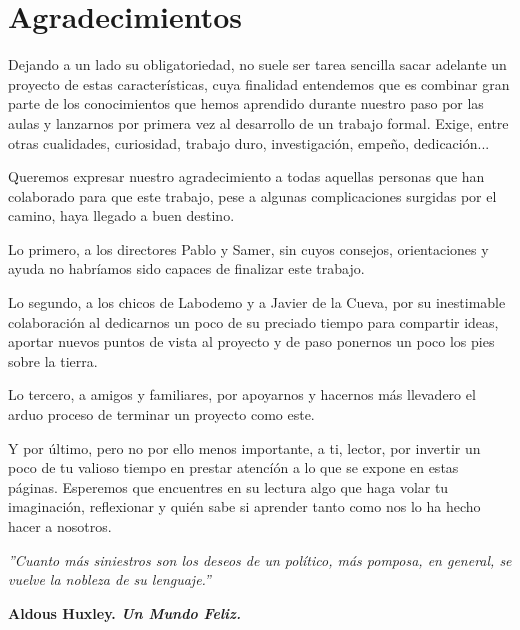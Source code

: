 
\newpage
\thispagestyle{empty}

\chapter*{Agradecimientos}

Dejando a un lado su obligatoriedad, no suele ser tarea sencilla sacar adelante un proyecto de estas características, cuya finalidad entendemos que es combinar gran parte de los conocimientos que hemos aprendido durante nuestro paso por las aulas y lanzarnos por primera vez al desarrollo de un trabajo formal. Exige, entre otras cualidades, curiosidad, trabajo duro, investigación, empeño, dedicación...

Queremos expresar nuestro agradecimiento a todas aquellas personas que han colaborado para que este trabajo, pese a algunas complicaciones surgidas por el camino, haya llegado a buen destino.

Lo primero, a los directores Pablo y Samer, sin cuyos consejos, orientaciones y ayuda no habríamos sido capaces de finalizar este trabajo.

Lo segundo, a los chicos de Labodemo y a Javier de la Cueva, por su inestimable colaboración al dedicarnos un poco de su preciado tiempo para compartir ideas, aportar nuevos puntos de vista al proyecto y de paso ponernos un poco los pies sobre la tierra.

Lo tercero, a amigos y familiares, por apoyarnos y hacernos más llevadero el arduo proceso de terminar un proyecto como este.

Y por último, pero no por ello menos importante, a ti, lector, por invertir un poco de tu valioso tiempo en prestar atencíón a lo que se expone en estas páginas.  Esperemos que encuentres en su lectura algo que haga volar tu imaginación, reflexionar y quién sabe si aprender tanto como nos lo ha hecho hacer a nosotros.

\vfill

\textit{''Cuanto más siniestros son los deseos de un político, más pomposa, en general, se vuelve la nobleza de su lenguaje.''}

\begin{flushright}
	\textbf{Aldous Huxley. \textit{Un Mundo Feliz.}}
\end{flushright}

\newpage
\tableofcontents
\newpage
\setcounter{page}{7}
{\listoffigures \let\cleardoublepage\relax \listoftables}
\newpage
